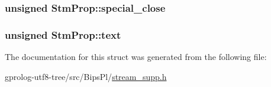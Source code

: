 \subsubsection[{\texorpdfstring{special\+\_\+close}{special_close}}]{\setlength{\rightskip}{0pt plus 5cm}unsigned Stm\+Prop\+::special\+\_\+close}\hypertarget{structStmProp_a77078202569393e5ac5b40c0e3b4e8af}{}\label{structStmProp_a77078202569393e5ac5b40c0e3b4e8af}
\subsubsection[{\texorpdfstring{text}{text}}]{\setlength{\rightskip}{0pt plus 5cm}unsigned Stm\+Prop\+::text}\hypertarget{structStmProp_ac19d8844240a9c3059104f8afd135834}{}\label{structStmProp_ac19d8844240a9c3059104f8afd135834}


The documentation for this struct was generated from the following file\+:\begin{DoxyCompactItemize}
\item 
gprolog-\/utf8-\/tree/src/\+Bips\+Pl/\hyperlink{stream__supp_8h}{stream\+\_\+supp.\+h}\end{DoxyCompactItemize}
